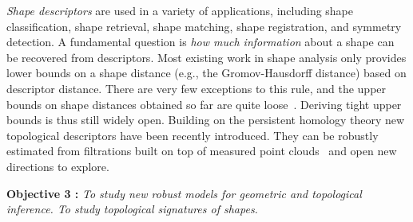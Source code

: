 {\em Shape descriptors} are used in a variety of applications, including shape classification, shape retrieval, shape matching, shape registration, and symmetry detection.  %
A fundamental question is {\em how much information} about a shape can be recovered from descriptors. Most existing work in shape analysis only provides lower bounds on a shape distance (e.g., the Gromov-Hausdorff distance) based on descriptor distance. There are very few exceptions to this rule, and the upper bounds on shape distances obtained so far are quite loose~\cite{bbk-gmds-06,ms-gh-05}. Deriving tight upper bounds is thus still widely open. 
Building on the persistent homology theory new topological descriptors have been recently introduced. They can be robustly estimated from filtrations built on top of measured point clouds~\cite{ccgmo-ghsssp-09, socg-pbsds-10}  and open new directions to explore.



\vspace{2mm}

{\bf Objective 3 :} {\em To study new {\em robust models for geometric and topological inference}.  To study topological signatures of shapes.}

